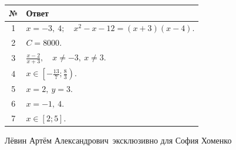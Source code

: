 \documentclass[a4paper,12pt]{article}
\newcommand{\student}{София Хоменко}
\newcommand{\teacher}{Лёвин Артём Александрович}
\begin{document}
\renewcommand{\arraystretch}{1.45}

\begin{table}[ht]
\centering
\begin{tabularx}{\linewidth}{@{}cX@{}}
\toprule
\textbf{№} & \textbf{Ответ} \\
\midrule
1 & \(x=-3,\ 4;\quad x^2-x-12=(x+3)(x-4)\). \\
2 & \(C=8000\). \\
3 & \(\displaystyle \frac{x-2}{x+3},\quad x\ne-3,\ x\ne3\). \\
4 & \(\displaystyle x\in\left[-\frac{13}{7};\frac83\right)\). \\
5 & \(x=2,\ y=3\). \\
6 & \(x=-1,\ 4\). \\
7 & \(x\in[2;5]\). \\
\bottomrule
\end{tabularx}
\end{table}

\vfill

\begin{center}
{\small\color{textgray}\teacher\ эксклюзивно для \student}
\end{center}

\clearpage
\end{document}

